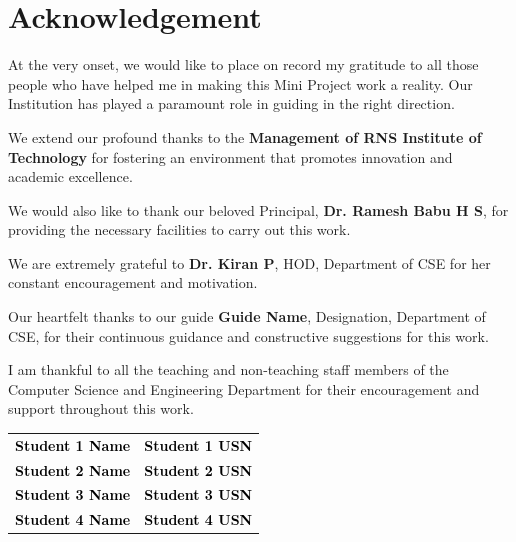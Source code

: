 \chapter*{Acknowledgement}%
%

\setlength{\parindent}{1cm} %

\hspace{1 cm}At the very onset, we would like to place on record my gratitude to all those people who have helped
me in making this Mini Project work a reality. Our Institution has played a paramount role in guiding
in the right direction.

We extend our profound thanks to the \textbf{Management of RNS Institute of Technology} for fostering an environment that promotes innovation and academic excellence.

We would also like to thank our beloved Principal, \textbf{Dr. Ramesh Babu H S}, for providing the necessary
facilities to carry out this work.

We are extremely grateful to \textbf{Dr. Kiran P}, HOD, Department of CSE for her constant encouragement and motivation.

Our heartfelt thanks to our guide \textbf{Guide Name}, Designation, Department of CSE, for their continuous guidance and constructive suggestions for this work.

I am thankful to all the teaching and non-teaching staff members of the Computer Science and Engineering Department for their encouragement and support throughout this work.
\\
\newline


\vspace{-0.1 cm}
\linespread{0.9}
\begin{flushright}
	\linespread{1.0}
	\renewcommand{\arraystretch}{0.85} %
	\begin{tabular}{ l l }
		\textcolor{black}{\small{\bf{Student 1 Name}}}  & \textcolor{black}{\small{\bf{Student 1 USN}}}\\
		\textcolor{black}{\small{\bf{Student 2 Name}}}  & \textcolor{black}{\small{\bf{Student 2 USN}}}\\ 
		\textcolor{black}{\small{\bf{Student 3 Name}}}  & \textcolor{black}{\small{\bf{Student 3 USN}}}\\
		\textcolor{black}{\small{\bf{Student 4 Name}}}  & \textcolor{black}{\small{\bf{Student 4 USN}}}\\
	\end{tabular}
	
\end{flushright}

